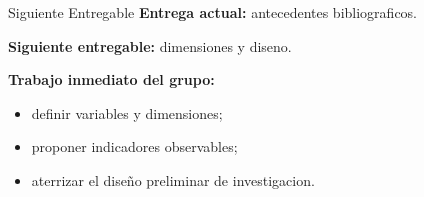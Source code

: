 \documentclass[aspectratio=169,11pt]{beamer}
\begin{document}
\begin{frame}{Siguiente Entregable}
\justifying
\textbf{Entrega actual:} antecedentes bibliograficos.

\vspace{0.7em}

\textbf{Siguiente entregable:} dimensiones y diseno.

\vspace{0.7em}

\textbf{Trabajo inmediato del grupo:}
\begin{itemize}
  \item definir variables y dimensiones;
  \item proponer indicadores observables;
  \item aterrizar el diseño preliminar de investigacion.
\end{itemize}
\end{frame}
\end{document}
